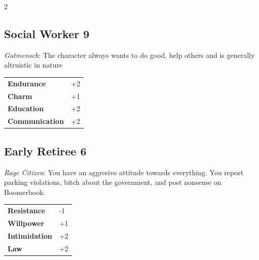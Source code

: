 \begin{multicols}{2}
\begin{tcolorbox}

\end{tcolorbox}

\begin{tcolorbox}
    \subsection*{Social Worker \hfill \small{9 }}
    \tcblower
\textit{Gutmensch}: The character  always wants to do good, help others and is generally altruistic in nature


\vspace{3mm}

\begin{tabular}{@{}ll@{}}
    \textbf{Endurance} & +2\\
    \textbf{Charm} & +1\\
    \textbf{Education} & +2\\
    \textbf{Communication} & +2\\
\end{tabular}


\end{tcolorbox}

\begin{tcolorbox}
    \subsection*{Early Retiree \hfill \small{6 }}
    \tcblower
\textit{Rage Citizen}: You have an aggresive attitude towards everything. You report parking violations, bitch about the government, and post nonsense on Boomerbook.


\vspace{3mm}

\begin{tabular}{@{}ll@{}}
    \textbf{Resistance} & -1\\
    \textbf{Willpower} & +1\\
    \textbf{Intimidation} & +2\\
    \textbf{Law} & +2\\
\end{tabular}


\end{tcolorbox}
\end{multicols}
